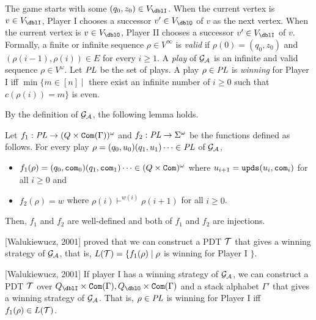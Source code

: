 The game starts with some $(q_0,z_0)\in V_\dblI$.
When the current vertex is $v\in V_\dblI$,
Player I chooses a successor $v'\in V_\dblO$ of $v$ as the next vertex.
When the current vertex is $v\in V_\dblO$,
Player II chooses a successor $v'\in V_\dblI$ of $v$.
Formally, a finite or infinite sequence $\rho\in V^\infty$ is
\emph{valid} if
$\rho(0)=(q_0,z_0)$ and
$(\rho(i-1), \rho(i))\in E$ for every $i\geq 1$.
A \emph{play} of ${\cal G}_{\cal A}$ is an infinite and valid sequence $\rho\in V^\omega$.
Let $\mathit{PL}$ be the set of plays.
A play $\rho\in \mathit{PL}$ is \emph{winning} for Player I iff
$\min\{m\in[n] \mid $ there exist an infinite
number of $i\geq 0$ such that $c(\rho(i)) = m\}$ is even.

By the definition of ${\cal G}_{\cal A}$,
the following lemma holds.
\begin{lemma}
\label{lem: cor}
Let $f_1: \mathit{PL}\to(Q\times\mathtt{Com}(\Gamma))^\omega$ and
$f_2: \mathit{PL}\to\Sigma^\omega$ be the functions defined as follows.
For every play
$\rho=(q_0,u_0)(q_1,u_1)\cdots\in \mathit{PL}$ of ${\cal G}_{\cal A}$,
\begin{itemize}
\item $f_1(\rho)=(q_0,\mathtt{com}_0)(q_1,\mathtt{com}_1)\cdots\in (Q\times\mathtt{Com})^\omega$ where
$u_{i+1} = \mathtt{upds}(u_{i},\mathtt{com}_i)$
for all $i\geq 0$ and
\item $f_2(\rho)=w$ where $\rho(i)\vdash^{w(i)} \rho(i+1)$
for all $i\geq 0$.
\end{itemize}
Then, $f_1$ and $f_2$ are well-defined and both of $f_1$ and $f_2$ are injections.
\end{lemma}
[Walukiewucz, 2001] proved that
we can construct a PDT ${\cal T}$
that gives a winning strategy of ${\cal G}_{\cal A}$,
that is, $L({\cal T}) = \{ f_1(\rho) \mid
\rho$ is winning for Player I $\}$.
\begin{theorem}{[Walukiewucz, 2001]}
\label{the: wal}
If player I has a winning strategy of ${\cal G}_{\cal A}$,
we can construct a PDT ${\cal T}$ over $Q_\dblI\times\Com(\Gamma), Q_\dblO\times\Com(\Gamma)$ and a stack alphabet $\Gamma'$ that gives a winning strategy of ${\cal G}_{\cal A}$.
That is, $\rho\in \mathit{PL}$ is winning for Player I iff $f_1(\rho)\in L({\cal T})$.
\end{theorem}

